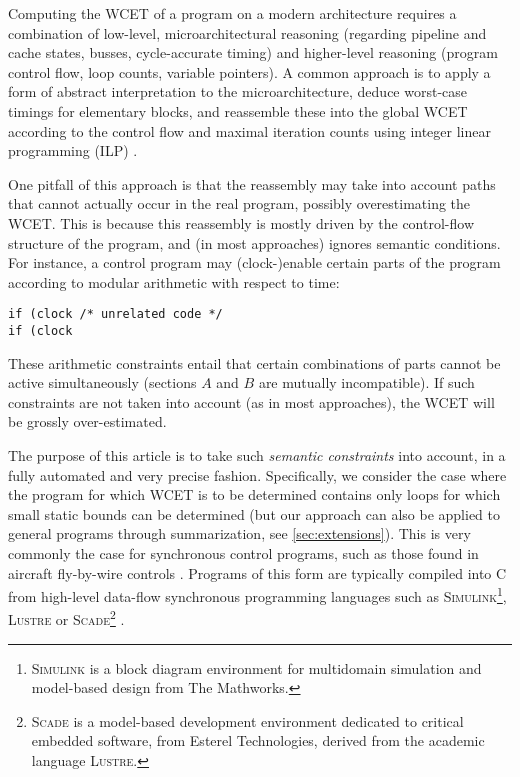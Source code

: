 \documentclass[a4paper,twocolumn,11pt]{article}
\newcommand{\RegTM}{\texttrademark}
\begin{document}
Computing the WCET of a program on a modern architecture requires a combination of low-level, microarchitectural reasoning (regarding pipeline and cache states, busses, cycle-accurate timing) and higher-level reasoning (program control flow, loop counts, variable pointers).
A common approach is to apply a form of abstract interpretation to the microarchitecture, deduce worst-case timings for elementary blocks, and reassemble these into the global WCET according to the control flow and maximal iteration counts using integer linear programming (ILP) \parencite{Theiling_et_al_2000,wilhelm-et-TECS08}.


One pitfall of this approach is that the reassembly may take into account paths that cannot actually occur in the real program, possibly overestimating the WCET.
This is because this reassembly is mostly driven by the control-flow structure of the program, and (in most approaches) ignores semantic conditions.
For instance, a control program may (clock-)enable certain parts of the program according to modular arithmetic with respect to time:
\begin{lstlisting}
if (clock /* unrelated code */
if (clock \end{lstlisting}
These arithmetic constraints entail that certain combinations of parts cannot be active simultaneously (sections $A$ and $B$ are mutually incompatible).
If such constraints are not taken into account (as in most approaches), the WCET will be grossly over-estimated.

The purpose of this article is to take such \emph{semantic constraints} into account, in a fully automated and very precise fashion.
Specifically, we consider the case where the program for which WCET is to be determined contains only loops for which small static bounds can be determined (but our approach can also be applied to general programs through summarization, see \autoref{sec:extensions}).
This is very commonly the case for synchronous control programs, such as those found in aircraft fly-by-wire controls \parencite{Souyris_et_al_FM2009}.
Programs of this form are typically compiled into C from high-level data-flow synchronous programming languages such as \textsc{Simulink}\footnote{\textsc{Simulink}{\RegTM} is a block diagram environment for multidomain simulation and model-based design from The Mathworks.},
\textsc{Lustre} or
\textsc{Scade}\footnote{\textsc{Scade}{\RegTM} is a model-based development environment dedicated to critical embedded software, from Esterel Technologies, derived from the academic language \textsc{Lustre}.}
\parencite{Caspi_et_al_Synchronous_2008}.
\end{document}
